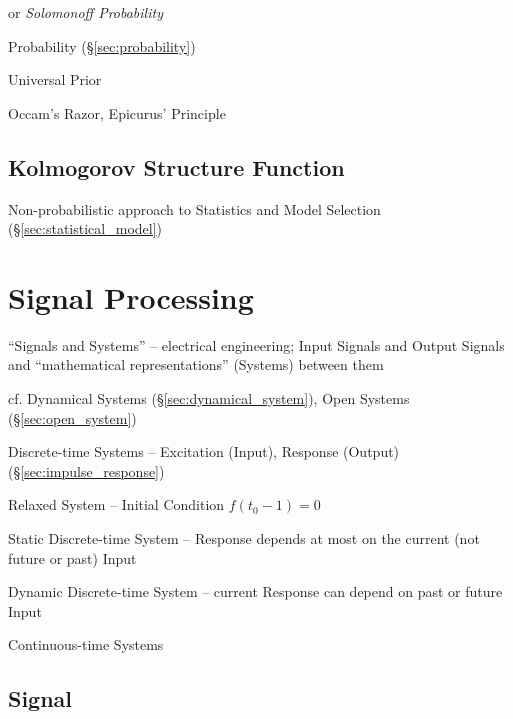or \emph{Solomonoff Probability}

\fist Probability (\S\ref{sec:probability})

Universal Prior

Occam's Razor, Epicurus' Principle



\subsection{Kolmogorov Structure Function}\label{sec:kolmogorov_structure}

Non-probabilistic approach to Statistics and Model Selection
(\S\ref{sec:statistical_model})



\section{Signal Processing}\label{sec:signal_processing}

``Signals and Systems'' -- electrical engineering; Input Signals and Output
Signals and ``mathematical representations'' (Systems) between them

\fist cf. Dynamical Systems (\S\ref{sec:dynamical_system}), Open Systems
(\S\ref{sec:open_system})


Discrete-time Systems -- Excitation (Input), Response (Output)
(\S\ref{sec:impulse_response})

Relaxed System -- Initial Condition $f(t_0-1) = 0$

Static Discrete-time System -- Response depends at most on the current (not
future or past) Input

Dynamic Discrete-time System -- current Response can depend on past or future
Input

Continuous-time Systems



\subsection{Signal}\label{sec:signal}

